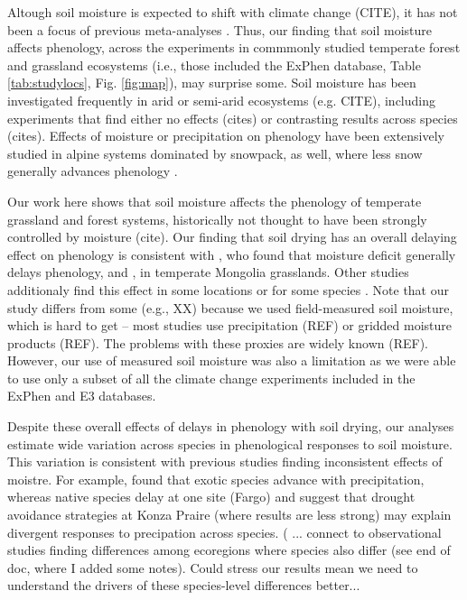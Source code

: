 \documentclass{article}
\begin{document}
\par Altough soil moisture is expected to shift with climate change (CITE), it has not been a focus of previous meta-analyses \cite[e.g.,][]{wolkovich2012}. Thus, our finding that soil moisture affects phenology, across the experiments in commmonly studied temperate forest and grassland ecosystems (i.e., those included the ExPhen database, Table \ref{tab:studylocs}, Fig. \ref{fig:map}), may surprise some. Soil moisture has been investigated frequently in arid or semi-arid ecosystems (e.g. CITE), including experiments that find either no effects (cites) or contrasting results across species (cites). Effects of moisture or precipitation on phenology have been extensively studied in alpine systems dominated by snowpack, as well, where less snow generally advances phenology \citep[e.g.,][]{dunne2004,sherwood2017}. 
\par Our work here shows that soil moisture affects the phenology of temperate grassland and forest systems, historically not thought to have been strongly controlled by moisture (cite). Our finding that soil drying has an overall delaying effect on phenology is consistent with \citet{seyed2018}, who found that moisture deficit generally delays phenology, and \citet{tao2020}, in temperate Mongolia grasslands. Other studies additionaly find this effect in some locations \citep{wang2022} or for some species \citep{tao2019}. Note that our study differs from some (e.g., XX) because we used field-measured soil moisture, which is hard to get -- most studies use precipitation (REF) or gridded moisture products (REF). The problems with these proxies are widely known (REF). However, our use of measured soil moisture was also a limitation as we were able to use only a subset of all the climate change experiments included in the ExPhen and E3 databases. 
\par Despite these overall effects of delays in phenology with soil drying, our analyses estimate wide variation across species in phenological responses to soil moisture. This variation is consistent with previous studies finding inconsistent effects of moistre. For example, \cite{wolkovich2012} found that exotic species advance with precipitation, whereas native species delay at one site (Fargo) and suggest that drought avoidance strategies at Konza Praire (where results are less strong) may explain divergent responses to precipation across species. ( ... connect to observational studies finding differences among ecoregions where species also differ (see end of doc, where I added some notes). Could stress our results mean we need to understand the drivers of these species-level differences better...
\end{document}
